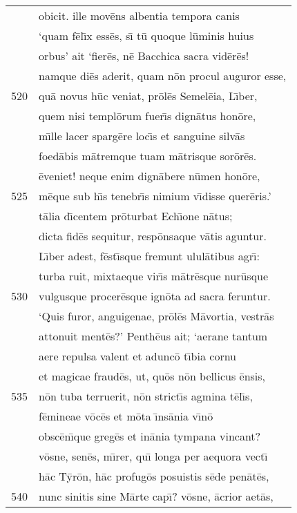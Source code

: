 \documentclass[paper=6in:9in,pagesize=pdftex,
               headinclude=on,footinclude=on,12pt]{scrbook}
\begin{document}
\begin{longtable}[p]{ r l }
 & obicit. ille mov\=ens albentia tempora canis\\ 
 & `quam f\=el\={\i}x ess\=es, s\={\i} t\=u quoque l\=uminis huius\\ 
 & orbus' ait `fier\=es, n\=e Bacchica sacra vid\=er\=es!\\ 
 & namque di\=es aderit, quam n\=on procul auguror esse,\\ 
520 & qu\=a novus h\=uc veniat, pr\=ol\=es Semel\=eia, L\={\i}ber,\\ 
 & quem nisi templ\=orum fuer\={\i}s dign\=atus hon\=ore,\\ 
 & m\={\i}lle lacer sparg\=ere loc\={\i}s et sanguine silv\=as\\ 
 & foed\=abis m\=atremque tuam m\=atrisque sor\=or\=es.\\ 
 & \=eveniet! neque enim dign\=abere n\=umen hon\=ore,\\ 
525 & m\=eque sub h\={\i}s tenebr\={\i}s nimium v\={\i}disse quer\=eris.'\\ 
 & t\=alia d\={\i}centem pr\=oturbat Ech\={\i}one n\=atus;\\ 
 & dicta fid\=es sequitur, resp\=onsaque v\=atis aguntur.\\ 
 & \indent L\={\i}ber adest, f\=est\={\i}sque fremunt ulul\=atibus agr\={\i}:\\ 
 & turba ruit, mixtaeque vir\={\i}s m\=atr\=esque nur\=usque\\ 
530 & vulgusque procer\=esque ign\=ota ad sacra feruntur.\\ 
 & `Quis furor, anguigenae, pr\=ol\=es M\=avortia, vestr\=as\\ 
 & attonuit ment\=es?' Penth\=eus ait; `aerane tantum\\ 
 & aere repulsa valent et adunc\=o t\={\i}bia cornu\\ 
 & et magicae fraud\=es, ut, qu\=os n\=on bellicus \=ensis,\\ 
535 & n\=on tuba terruerit, n\=on strict\={\i}s agmina t\=el\={\i}s,\\ 
 & f\=emineae v\=oc\=es et m\=ota \={\i}ns\=ania v\={\i}n\=o\\ 
 & obsc\=en\={\i}que greg\=es et in\=ania tympana vincant?\\ 
 & v\=osne, sen\=es, m\={\i}rer, qu\={\i} longa per aequora vect\={\i}\\ 
 & h\=ac T\=yr\=on, h\=ac profug\=os posuistis s\=ede pen\=at\=es,\\ 
540 & nunc sinitis sine M\=arte cap\={\i}? v\=osne, \=acrior aet\=as,\\ 

\end{longtable}
\end{document}
